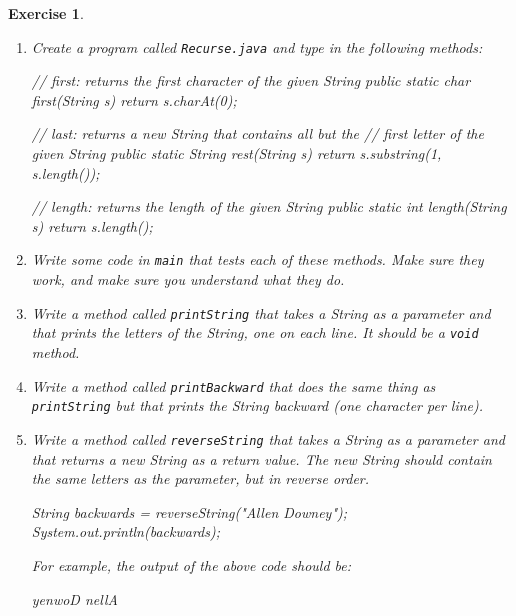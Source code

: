 \documentclass[12pt]{book}
\theoremstyle{exercise}
\newtheorem{exercise}{Exercise}[chapter]
\begin{document}
\begin{exercise}
\begin{enumerate}

\item Create a program called {\tt Recurse.java} and type in the following methods:

\begin{code}
    // first: returns the first character of the given String
    public static char first(String s) {
        return s.charAt(0);
    }

    // last: returns a new String that contains all but the
    // first letter of the given String
    public static String rest(String s) {
        return s.substring(1, s.length());
    }

    // length: returns the length of the given String
    public static int length(String s) {
        return s.length();
    }
\end{code}

\item Write some code in {\tt main} that tests each of these methods.
Make sure they work, and make sure you understand what they do.

\item Write a method called {\tt printString} that takes a String as a parameter and that prints the letters of the String, one on each line.  It should be a {\tt void} method.

\item Write a method called {\tt printBackward} that does the same thing as {\tt printString} but that prints the String backward (one character per line).

\item Write a method called {\tt reverseString} that takes a String as a parameter and that returns a new String as a return value.
The new String should contain the same letters as the parameter, but in reverse order.

\begin{code}
    String backwards = reverseString("Allen Downey");
    System.out.println(backwards);
\end{code}

For example, the output of the above code should be:

\begin{stdout}
yenwoD nellA
\end{stdout}

\end{enumerate}
\end{exercise}
\end{document}

